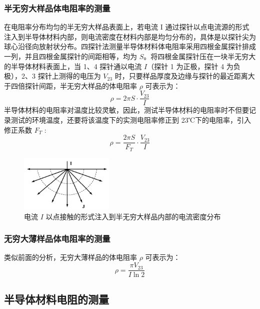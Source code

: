 \documentclass[a4paper,utf8]{article}
\begin{document}
        \subsubsection{半无穷大样品体电阻率的测量}
            在电阻率分布均匀的半无穷大样品表面上，若电流 I 通过探针以点电流源的形式注入到半导体材料内部，则电流密度在材料内部是均匀分布的，具体是以探针尖为球心沿径向放射状分布。四探针法测量半导体材料体电阻率采用四根金属探针排成一列，并且四根金属探针的间距相等，均为 $S$。将四根金属探针压在一块半无穷大的半导体材料表面上，当 1、4 探针通以电流 $I$（探针 1 为正极，探针 4 为负极），2、3 探针上测得的电压为 $V_{23}$ 时，只要样品厚度及边缘与探针的最近距离大于四倍探针间距，半无穷大样品的体电阻率 $\rho$ 可表示为：
            \begin{equation}
                \rho = 2\pi S\cdot\frac{V_{23}}{I} \label{eq:0}
            \end{equation}
            半导体材料的电阻率对温度比较灵敏，因此，测试半导体材料的电阻率时不但要记录测试的环境温度，还要将该温度下的实测电阻率修正到 23℃下的电阻率，引入修正系数 $F_T$ : 
            \begin{equation}
                \rho =\frac{2\pi S}{F_T}\cdot\frac{V_{23}}{I}
            \end{equation}
            \begin{figure}[!ht]
                \includegraphics[width=0.4\textwidth]{1.jpg}
                \caption{电流 $I$ 以点接触的形式注入到半无穷大样品内部的电流密度分布}
            \end{figure}
        \subsubsection{无穷大薄样品体电阻率的测量}
            类似前面的分析，无穷大薄样品的体电阻率 $\rho$ 可表示为：
            \begin{equation}
                \rho =\frac{\pi V_{23}}{I \ln 2} \label{eq:1}
            \end{equation}
    \subsection{半导体材料电阻的测量}        
\end{document}
